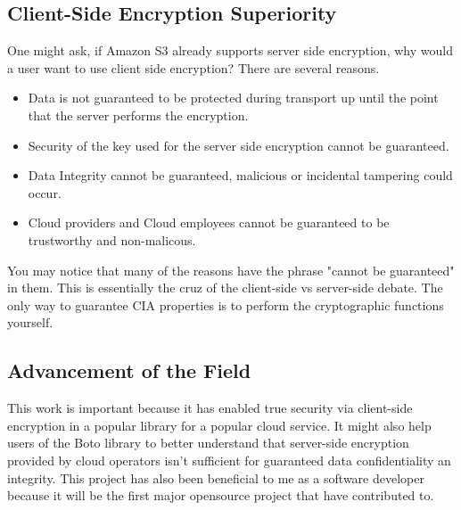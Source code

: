 \subsection{Client-Side Encryption Superiority}
One might ask, if Amazon S3 already supports server side encryption, why would a user want to use client side encryption? There are several reasons.
\begin{itemize}
    \item Data is not guaranteed to be protected during transport up until the point that the server performs the encryption.
    \item Security of the key used for the server side encryption cannot be guaranteed.
    \item Data Integrity cannot be guaranteed, malicious or incidental tampering could occur.
    \item Cloud providers and Cloud employees cannot be guaranteed to be trustworthy and non-malicous.
\end{itemize}

You may notice that many of the reasons have the phrase "cannot be guaranteed" in them. This is essentially the cruz of the client-side vs server-side debate.
The only way to guarantee CIA properties is to perform the cryptographic functions yourself.

\subsection{Advancement of the Field}
This work is important because it has enabled true security via client-side encryption in a popular library for a popular cloud service.
It might also help users of the Boto library to better understand that server-side encryption provided by cloud operators isn't sufficient for guaranteed data confidentiality an integrity.
This project has also been beneficial to me as a software developer because it will be the first major opensource project that have contributed to.

